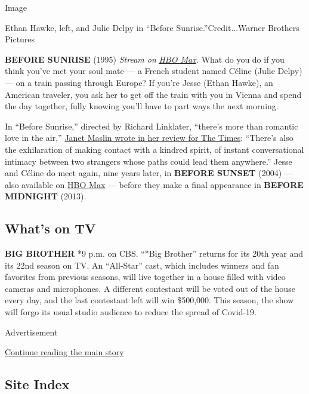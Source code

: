 Image

Ethan Hawke, left, and Julie Delpy in ``Before Sunrise.''Credit...Warner
Brothers Pictures

\textbf{BEFORE SUNRISE} (1995) \emph{Stream on}
\href{https://www.hbo.com/movies/before-sunrise}{\emph{HBO Max}}\emph{.}
What do you do if you think you've met your soul mate --- a French
student named Céline (Julie Delpy) --- on a train passing through
Europe? If you're Jesse (Ethan Hawke), an American traveler, you ask her
to get off the train with you in Vienna and spend the day together,
fully knowing you'll have to part ways the next morning.

In ``Before Sunrise,'' directed by Richard Linklater, ``there's more
than romantic love in the air,''
\href{https://www.nytimes3xbfgragh.onion/1995/01/27/movies/film-review-strangers-on-a-train-and-soul-mates-for-a-night.html}{Janet
Maslin wrote in her review for The Times}: ``There's also the
exhilaration of making contact with a kindred spirit, of instant
conversational intimacy between two strangers whose paths could lead
them anywhere.'' Jesse and Céline do meet again, nine years later, in
\textbf{BEFORE SUNSET} (2004) --- also available on
\href{https://www.hbo.com/movies/before-sunset}{HBO Max} --- before they
make a final appearance in \textbf{BEFORE MIDNIGHT} (2013).

\hypertarget{whats-on-tv}{%
\subsection{What's on TV}\label{whats-on-tv}}

\textbf{BIG BROTHER} *9 p.m. on CBS. ``*Big Brother'' returns for its
20th year and its 22nd season on TV. An ``All-Star'' cast, which
includes winners and fan favorites from previous seasons, will live
together in a house filled with video cameras and microphones. A
different contestant will be voted out of the house every day, and the
last contestant left will win \$500,000. This season, the show will
forgo its usual studio audience to reduce the spread of Covid-19.

Advertisement

\protect\hyperlink{after-bottom}{Continue reading the main story}

\hypertarget{site-index}{%
\subsection{Site Index}\label{site-index}}

